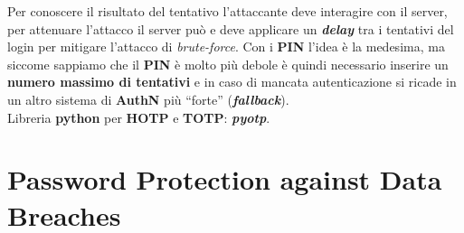 \begin{flushleft}
    Per conoscere il risultato del tentativo l'attaccante deve interagire con il server, per attenuare l'attacco il server può e deve applicare un \textbf{\textit{delay}} tra i tentativi del login per mitigare l'attacco di \textit{brute-force}. Con i \textbf{PIN} l'idea è la medesima, ma siccome sappiamo che il \textbf{PIN} è molto più debole è quindi necessario inserire un \textbf{numero massimo di tentativi} e in caso di mancata autenticazione si ricade in un altro sistema di \textbf{AuthN} più ``forte'' (\textbf{\textit{fallback}}). \\

    Libreria \textbf{python} per \textbf{HOTP} e \textbf{TOTP}: \textbf{\textit{pyotp}}.

\end{flushleft}

\section{Password Protection against Data Breaches}

